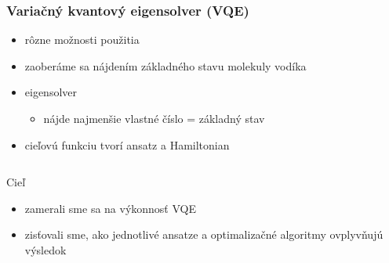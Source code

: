 \documentclass{beamer}
\begin{document}
\begin{frame}
    \frametitle{Variačný kvantový eigensolver (VQE)}
    \begin{itemize}
        \item rôzne možnosti použitia
        \item zaoberáme sa nájdením základného stavu molekuly vodíka
        \item eigensolver
        \begin{itemize}
            \item nájde najmenšie vlastné číslo = základný stav 
        \end{itemize} 
        \item cieľovú funkciu tvorí ansatz a Hamiltonian
    \end{itemize}
    \begin{columns}[T] %
        \begin{column}{0.0\textwidth} %
        \end{column}
        \begin{column}{0.95\textwidth} %
        \end{column}
    \end{columns}
    \begin{block}{Cieľ}
        \begin{itemize}
            \item zamerali sme sa na výkonnosť VQE
            \item zisťovali sme, ako jednotlivé ansatze a optimalizačné algoritmy ovplyvňujú výsledok
        \end{itemize}
    \end{block}
\end{frame}
\end{document}
